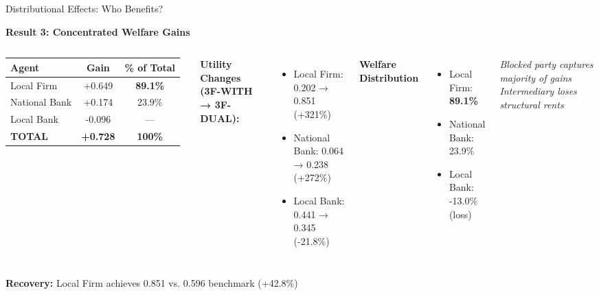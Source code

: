 \documentclass[aspectratio=169]{beamer}
\begin{document}
\begin{frame}{Distributional Effects: Who Benefits?}
    
    \textbf{Result 3: Concentrated Welfare Gains}
    
    \vspace{0.3cm}
    \begin{columns}
        \begin{table}
            \centering
            \small
            \begin{tabular}{lcc}
                \toprule
                \textbf{Agent} & \textbf{Gain} & \textbf{\% of Total} \\
                \midrule
                Local Firm & +0.649 & \textcolor{SafeGreen}{\textbf{89.1\%}} \\
                National Bank & +0.174 & 23.9\% \\
                Local Bank & -0.096 & --- \\
                \midrule
                \textbf{TOTAL} & \textbf{+0.728} & \textbf{100\%} \\
                \bottomrule
            \end{tabular}
        \end{table}
        
        \vspace{0.3cm}
        \textbf{Utility Changes (3F-WITH → 3F-DUAL):}
        \begin{itemize}
            \item Local Firm: 0.202 → 0.851 \textcolor{SafeGreen}{(+321\%)}
            \item National Bank: 0.064 → 0.238 (+272\%)
            \item Local Bank: 0.441 → 0.345 (-21.8\%)
        \end{itemize}
        
        \centering
        \textbf{Welfare Distribution}
        
        \vspace{0.5cm}
        \begin{itemize}
            \item Local Firm: \textcolor{SafeGreen}{\textbf{89.1\%}}
            \item National Bank: \textcolor{DeepBlue}{23.9\%}
            \item Local Bank: \textcolor{AlertRed}{-13.0\%} (loss)
        \end{itemize}
        
        \vspace{0.5cm}
        \small{\textit{Blocked party captures majority of gains}}
        \vspace{0.2cm}
        \small{\textit{Intermediary loses structural rents}}
    \end{columns}
    
    \vspace{0.2cm}
    \textbf{Recovery:} Local Firm achieves 0.851 vs. 0.596 benchmark (+42.8\%)

\end{frame}
\end{document}
